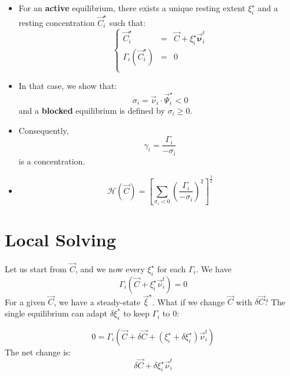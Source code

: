 \documentclass[aps,12pt]{revtex4}
\begin{document}
\begin{itemize}
\item For an {\bf active} equilibrium, there exists a unique resting extent $\xi_i^\star$ and a resting concentration $\vec{C}_i^\star$ such that:
\begin{equation}
\left\lbrace
\begin{array}{rcl}
	\vec{C}_i^\star & = & \vec{C} + \xi_i^\star \vec{\bm{\nu}}^t_i\\
	\Gamma_i(\vec{C}_i^\star) & = & 0 \\
\end{array}
\right.
\end{equation}

\item In that case, we show that:
\begin{equation}
	\sigma_i = \vec{\nu}_i \cdot \vec{\Psi}_i^\star < 0
\end{equation}	
and a {\bf blocked} equilibrium is defined by $\sigma_i\geq 0$.

\item Consequently,
\begin{equation}
	\gamma_i = \dfrac{\Gamma_i}{-\sigma_i} 
\end{equation}
is a concentration.

\item \begin{equation}
\mathcal{H}(\vec{C}) = \left\lbrack\sum_{\sigma_i<0} \left(\dfrac{\Gamma_i}{-\sigma_i}\right)^2 \right\rbrack^{\frac{1}{2}}
\end{equation}

 
\end{itemize}
 
 
 
\section{Local Solving}

Let us start from $\vec{C}$, and we now every $\xi_i^\star$ for each $\Gamma_i$.
We have
\begin{equation}
	\Gamma_i\left(\vec{C} + \xi_i^\star \vec{\nu}^t_i\right) =  0
\end{equation}
For a given $\vec{C}$, we have a steady-state $\vec{\xi}^\star$.
What if we change $\vec{C}$ with $\delta\vec{C}$?
The single equilibrium can adapt $\delta\xi_i^*$ to keep $\Gamma_i$ to $0$:

$$
0 = \Gamma_i\left( \vec{C} + \delta\vec{C} + (\xi_i^\star+\delta\xi_i^\star) \vec{\nu}^t_i \right)
$$
The net change is:
$$
	\delta\vec{C} + \delta\xi_i^\star \vec{\nu}^t_i 
$$
\end{document}
